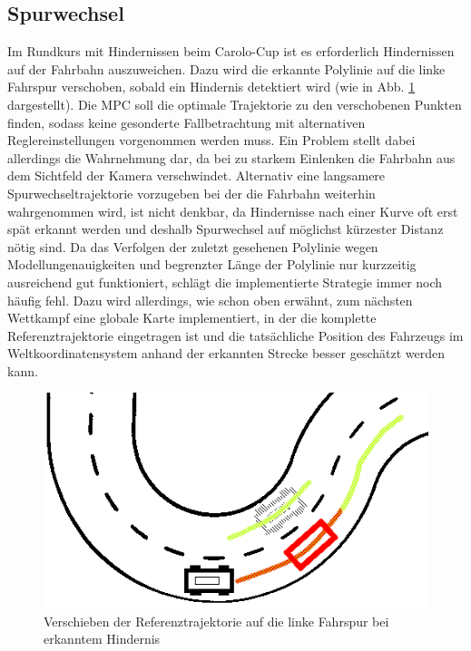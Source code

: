 \subsection{Spurwechsel}
Im Rundkurs mit Hindernissen beim Carolo-Cup ist es erforderlich Hindernissen auf der Fahrbahn auszuweichen. Dazu wird die erkannte Polylinie auf die linke Fahrspur verschoben, sobald ein Hindernis detektiert wird (wie in Abb. \ref{fig:spurwechsel} dargestellt). Die MPC soll die optimale Trajektorie zu den verschobenen Punkten finden, sodass keine gesonderte Fallbetrachtung mit alternativen Reglereinstellungen vorgenommen werden muss. Ein Problem stellt dabei allerdings die Wahrnehmung dar, da bei zu starkem Einlenken die Fahrbahn aus dem Sichtfeld der Kamera verschwindet. Alternativ eine langsamere Spurwechseltrajektorie vorzugeben bei der die Fahrbahn weiterhin wahrgenommen wird, ist nicht denkbar, da Hindernisse nach einer Kurve oft erst spät erkannt werden und deshalb Spurwechsel auf möglichst kürzester Distanz nötig sind. Da das Verfolgen der zuletzt gesehenen Polylinie wegen Modellungenauigkeiten und begrenzter Länge der Polylinie nur kurzzeitig ausreichend gut funktioniert, schlägt die implementierte Strategie immer noch häufig fehl. Dazu wird allerdings, wie schon oben erwähnt, zum nächsten Wettkampf eine globale Karte implementiert, in der die komplette Referenztrajektorie eingetragen ist und die tatsächliche Position des Fahrzeugs im Weltkoordinatensystem anhand der erkannten Strecke besser geschätzt werden kann.
\begin{figure}[t]
\centering
\includegraphics[scale=0.55]{Bilder/Spurwechsel.png}
\caption{Verschieben der Referenztrajektorie auf die linke Fahrspur bei erkanntem Hindernis}
\label{fig:spurwechsel}
\end{figure}
